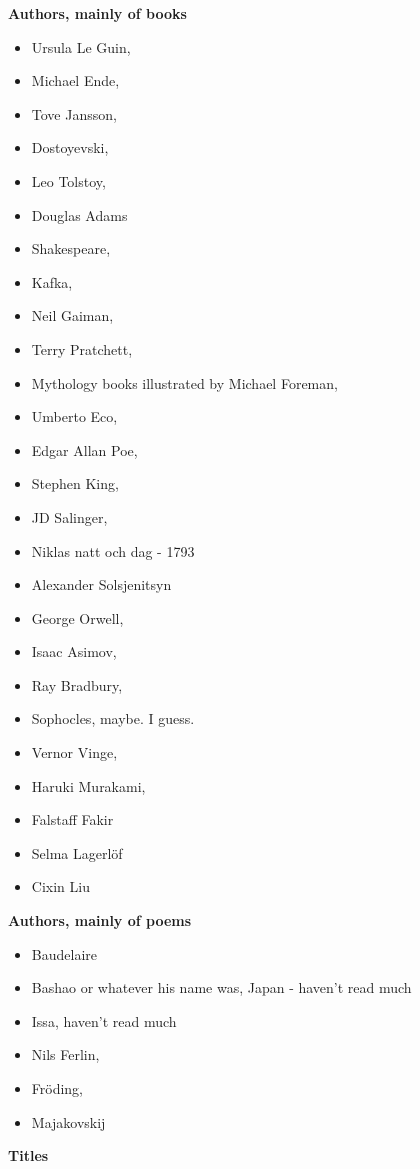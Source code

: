 \documentclass{article}
\begin{document}
\textbf{Authors, mainly of books}
\begin{itemize}
\item Ursula Le Guin, 
\item Michael Ende, 
\item Tove Jansson, 
\item Dostoyevski, 
\item Leo Tolstoy, 
\item Douglas Adams
\item Shakespeare,
\item Kafka,
\item Neil Gaiman,
\item Terry Pratchett, 
\item Mythology books illustrated by Michael Foreman, 
\item Umberto Eco, 
\item Edgar Allan Poe, 
\item Stephen King,
\item JD Salinger, 
\item Niklas natt och dag - 1793
\item Alexander Solsjenitsyn
\item George Orwell, 
\item Isaac Asimov, 
\item Ray Bradbury,
\item Sophocles, maybe. I guess. 
\item Vernor Vinge, 
\item Haruki Murakami, 
\item Falstaff Fakir
\item Selma Lagerlöf
\item Cixin Liu
\end{itemize}
\textbf{Authors, mainly of poems}
\\
\begin{itemize}
\item Baudelaire
\item Bashao or whatever his name was, Japan - haven't read much
\item Issa, haven't read much
\item Nils Ferlin,
\item Fröding, 
\item Majakovskij
\end{itemize}
\textbf{Titles}
\\
\end{document}
